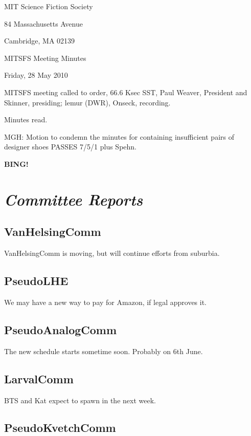 \documentclass[10pt]{article}
\newcommand{\bing}{{\bf BING!} }
\newcommand{\goto}[1]{\bing \vskip 12pt \section*{{\em{#1}}}}
\newcommand{\ps}{ plus Spehn\xspace}
\newcommand{\skinner}{Paul Weaver, President and Skinner}
\newcommand{\onseck}{lemur (DWR), Onseck}
\newcommand{\meetingdate}{Friday, 28 May 2010}
\begin{document}
\begin{center}

MIT Science Fiction Society

84 Massachusetts Avenue

Cambridge, MA 02139

\vspace{12pt}

MITSFS Meeting Minutes

\meetingdate

\end{center}

\vspace{18pt}

\setlength{\parskip}{6pt}

\noindent
MITSFS meeting called to order, 66.6 Ksec SST,
\skinner, presiding; \onseck, recording.

Minutes read.

MGH: Motion to condemn the minutes for containing insufficient pairs of
designer shoes PASSES 7/5/1\ps.


\goto{Committee Reports}

\subsection*{VanHelsingComm}

VanHelsingComm is moving, but will continue efforts from suburbia.

\subsection*{PseudoLHE}

We may have a new way to pay for Amazon, if legal approves it.

\subsection*{PseudoAnalogComm}

The new schedule starts sometime soon.  Probably on 6th June.

\subsection*{LarvalComm}

BTS and Kat expect to spawn in the next week.

\subsection*{PseudoKvetchComm}
\end{document}
